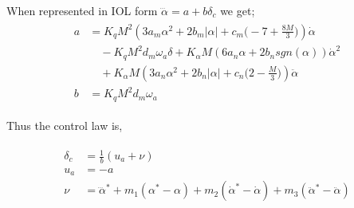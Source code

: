 \documentclass[table,10pt,red]{beamer}	%
\begin{document}
\begin{frame}
When represented in IOL form $\dddot{\alpha} = a + b\delta_c$ we get; 
\begin{eqnarray*}
	\begin{aligned}
		a &= K_qM^2(3a_m\alpha^2+2b_m|\alpha|+c_m\Big(-7+\frac{8M}{3}\Big))\dot{\alpha} \\ 
		&\quad -K_qM^2d_m\omega_a\delta+K_\alpha M(6a_n\alpha+2b_nsgn(\alpha))\dot{\alpha}^2\\ 
		&\quad+K_\alpha M(3a_n\alpha^2+2b_n|\alpha|+c_n\Big(2-\frac{M}{3}\Big))\ddot{\alpha} \\
		b &= K_q M^2d_m\omega_a \nonumber
	\end{aligned}
	\label{eq5}
\end{eqnarray*}

Thus the control law is, 

\begin{eqnarray*}
	\begin{aligned}
		\delta_c &= \frac{1}{b}(u_a+\nu) \\ \label{iol_control}
		u_a &= -a \label{ua_eqn}\\
		\nu &= \dddot{\alpha}^\ast+m_1(\alpha^\ast-\alpha) + m_2(\dot{\alpha}^\ast-\dot{\alpha}) + m_3(\ddot{\alpha}^\ast-\ddot{\alpha}) \label{nu_eqn}
	\end{aligned}
	\label{eq5}
\end{eqnarray*}

\end{frame}
\end{document}
